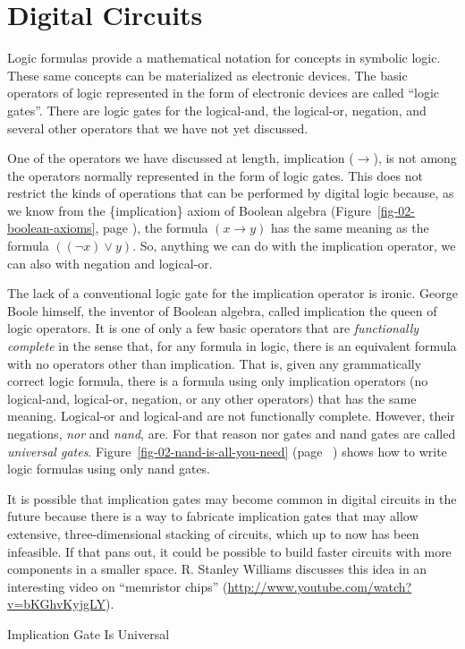 \section{Digital Circuits}

Logic formulas provide a mathematical notation for concepts in symbolic logic.
These same concepts can be materialized as electronic devices.
The basic operators of logic represented in the form of electronic devices
are called ``logic gates''.
There are logic gates for the logical-and, the logical-or, negation, and
several other operators that we have not yet discussed.

\begin{aside}
One of the operators we have discussed at length, implication
($\rightarrow$), is not among the operators normally represented
in the form of logic gates. This does not restrict the kinds of
operations that can be performed by digital logic because,
as we know from the \{implication\} axiom of Boolean algebra
(Figure~\ref{fig-02-boolean-axioms}, page \pageref{fig-02-boolean-axioms}),
the formula $(x \rightarrow y)$ has the same meaning as the
formula $((\neg x) \vee y)$. So, anything we can do with
the implication operator, we can also with
negation and logical-or.

The lack of a conventional logic gate for the implication operator
is ironic.
George Boole himself, the inventor of Boolean algebra,
called implication the queen of logic operators.
It is one of only a few basic operators
that are \emph{functionally complete} in the sense that,
for any formula in logic, there is an equivalent formula
with no operators other than implication.
That is, given any grammatically correct logic formula,
there is a formula using only
implication operators (no logical-and, logical-or,
negation, or any other operators)
that has the same meaning.
Logical-or and logical-and are not functionally complete.
However, their negations, \emph{nor} and \emph{nand}, are.
For that reason nor gates and nand gates
are called \emph{universal gates}.
Figure~\ref{fig-02-nand-is-all-you-need} (page ~\pageref{fig-02-nand-is-all-you-need})
shows how to write logic formulas using only nand gates.

It is possible that implication gates may
become common in digital circuits in the future
because there is a way to fabricate implication gates that may allow extensive,
three-dimensional stacking of circuits, which up to now has been infeasible.
If that pans out, it could be possible to build
faster circuits with more components in a smaller space.
R. Stanley Williams discusses this
idea in an interesting video on ``memristor chips''
(\url{http://www.youtube.com/watch?v=bKGhvKyjgLY}).
\caption{Implication Gate Is Universal}
\label{no-implication-gate}
\end{aside}

